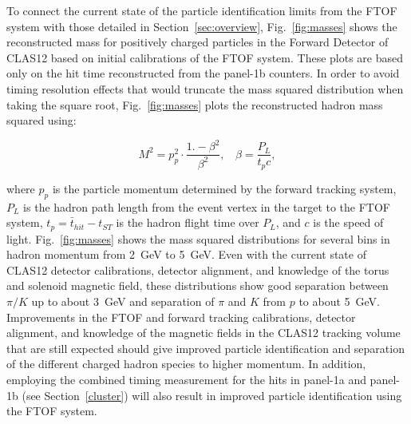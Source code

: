 \documentclass[final,3p,twocolumn]{elsarticle}
\begin{document}
To connect the current state of the particle identification limits from the FTOF system with those
detailed in Section~\ref{sec:overview}, Fig.~\ref{fig:masses} shows the reconstructed mass for positively
charged particles in the Forward Detector of CLAS12 based on initial calibrations of the FTOF system.
These plots are based only on the hit time reconstructed from the panel-1b counters. In order to avoid
timing resolution effects that would truncate the mass squared distribution when taking the square root,
Fig.~\ref{fig:masses} plots the reconstructed hadron mass squared using:

\begin{equation}
M^2 = p_p^2 \cdot \frac{1.-\beta^2}{\beta^2},~~~~\beta=\frac{P_L}{t_p c},
\end{equation}

\noindent
where $p_p$ is the particle momentum determined by the forward tracking system, $P_L$ is the hadron
path length from the event vertex in the target to the FTOF system, $t_p= \bar{t}_{hit} - t_{ST}$ is
the hadron flight time over $P_L$, and $c$ is the speed of light. Fig.~\ref{fig:masses} shows the mass
squared distributions for several bins in hadron momentum from 2~GeV to 5~GeV. Even with the current
state of CLAS12 detector calibrations, detector alignment, and knowledge of the torus and solenoid
magnetic field, these distributions show good separation between $\pi/K$ up to about 3~GeV and
separation of $\pi$ and $K$ from $p$ to about 5~GeV. Improvements in the FTOF and forward tracking
calibrations, detector alignment, and knowledge of the magnetic fields in the CLAS12 tracking volume
that are still expected should give improved particle identification and separation of the different charged
hadron species to higher momentum. In addition, employing the combined timing measurement for the hits in
panel-1a and panel-1b (see Section~\ref{cluster}) will also result in improved particle identification using the
FTOF system.
\end{document}
